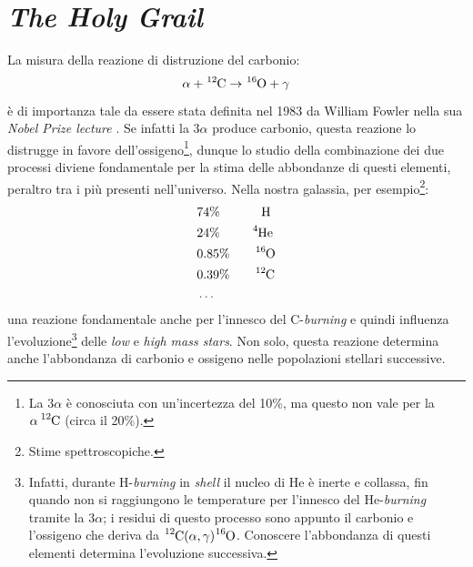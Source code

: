\newpage
\section{\textit{The Holy Grail}}\label{sec-holy-grail}
La misura della reazione di distruzione del carbonio:
$$\alpha +\ce{^{12}C}\to\ce{^{16}O}+\gamma$$
è di importanza tale da essere stata definita nel 1983 da William Fowler nella sua \textit{Nobel Prize lecture} \textit{}. Se infatti la $3\alpha$ produce carbonio, questa reazione lo distrugge in favore dell'ossigeno\footnote{La $3\alpha$ è conosciuta con un'incertezza del 10\%, ma questo non vale per la $\alpha\, \ce{^{12}C}$ (circa il 20\%).}, dunque lo studio della combinazione dei due processi diviene fondamentale per la stima delle abbondanze di questi elementi, peraltro tra i più presenti nell'universo. Nella nostra galassia, per esempio\footnote{Stime spettroscopiche.}:
\begin{align*}
	&74\%\qquad\;\quad\ce{H} \\
	&24\%\qquad\;\;\ce{^{4}He} \\
	&0.85\%\qquad\ce{^{16}O} \\
	&0.39\%\qquad\ce{^{12}C} \\
	&\dots
\end{align*}
 una reazione fondamentale anche per l'innesco del C-\textit{burning} e quindi influenza l'evoluzione\footnote{Infatti, durante H-\textit{burning} in \textit{shell} il nucleo di He è inerte e collassa, fin quando non si raggiungono le temperature per l'innesco del He-\textit{burning} tramite la $3\alpha$; i residui di questo processo sono appunto il carbonio e l'ossigeno che deriva da $\ce{^{12}C}(\alpha,\gamma)\ce{^{16}O}$. Conoscere l'abbondanza di questi elementi determina l'evoluzione successiva.} delle \textit{low} e \textit{high mass stars}. Non solo, questa reazione determina anche l'abbondanza di carbonio e ossigeno nelle popolazioni stellari successive.

